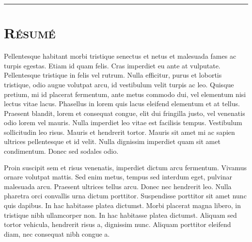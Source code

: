 \vskip1cm
\hrule

\section*{\textsc{\huge Résumé}}


Pellentesque habitant morbi tristique senectus et netus et malesuada fames ac turpis egestas. Etiam id quam felis. Cras imperdiet eu ante at vulputate. Pellentesque tristique in felis vel rutrum. Nulla efficitur, purus et lobortis tristique, odio augue volutpat arcu, id vestibulum velit turpis ac leo. Quisque pretium, mi id placerat fermentum, ante metus commodo dui, vel elementum nisi lectus vitae lacus. Phasellus in lorem quis lacus eleifend elementum et at tellus. Praesent blandit, lorem et consequat congue, elit dui fringilla justo, vel venenatis odio lorem vel mauris. Nulla imperdiet leo vitae est facilisis tempus. Vestibulum sollicitudin leo risus. Mauris et hendrerit tortor. Mauris sit amet mi ac sapien ultrices pellentesque et id velit. Nulla dignissim imperdiet quam sit amet condimentum. Donec sed sodales odio.

Proin suscipit sem et risus venenatis, imperdiet dictum arcu fermentum. Vivamus ornare volutpat mattis. Sed enim metus, tempus sed interdum eget, pulvinar malesuada arcu. Praesent ultrices tellus arcu. Donec nec hendrerit leo. Nulla pharetra orci convallis urna dictum porttitor. Suspendisse porttitor sit amet nunc quis dapibus. In hac habitasse platea dictumst. Morbi placerat magna libero, in tristique nibh ullamcorper non. In hac habitasse platea dictumst. Aliquam sed tortor vehicula, hendrerit risus a, dignissim nunc. Aliquam porttitor eleifend diam, nec consequat nibh congue a. 
